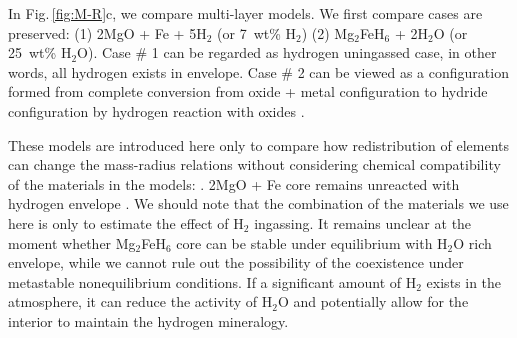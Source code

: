 \documentclass[draft,jgrga,12pt]{agujournal2019}
\begin{document}
In Fig.\,\ref{fig:M-R}c, we compare multi-layer models.
We first compare cases  are preserved: (1) 2MgO + Fe + 5H$_2$ (or 7~wt\% H$_2$)  (2) Mg$_2$FeH$_6$ + 2H$_2$O (or 25~wt\% H$_2$O).
Case \# 1 can be regarded as hydrogen uningassed case, in other words, all hydrogen exists in envelope.
Case \# 2 can be viewed as a configuration formed from complete conversion from oxide + metal configuration to hydride configuration by hydrogen reaction with oxides \cite{horn_building_2025, kim_stability_2023}.

These models are introduced here only to compare how redistribution of elements  can change the mass-radius relations without considering chemical compatibility of the materials in the models: .
 2MgO + Fe core  remains unreacted with hydrogen envelope \cite{kim_stability_2023}.
We should note that the combination of the materials we use here is only to estimate the effect of H$_2$ ingassing.
It remains unclear at the moment whether Mg$_2$FeH$_6$ core can be stable under equilibrium with H$_2$O rich envelope, while we cannot rule out the possibility of the coexistence under metastable nonequilibrium conditions.
If a significant amount of H$_2$ exists in the atmosphere, it can reduce the activity of H$_2$O and potentially allow for the interior to maintain the hydrogen mineralogy.
\end{document}
